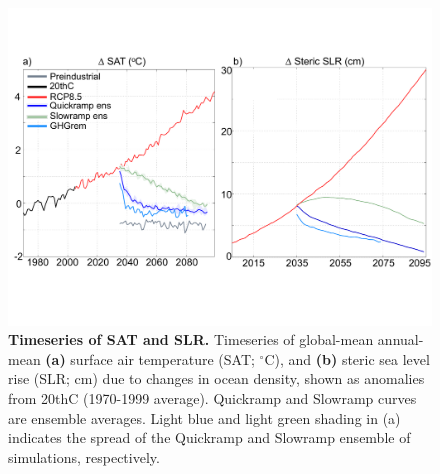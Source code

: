\documentclass[grl]{AGUTeX}  %
\begin{document}
\begin{article}
\begin{figure}[htbp] %
\centering
 \noindent\includegraphics[width=39pc]{figures/SATSLRtimeseries2.pdf}
\caption{\textbf{Timeseries of SAT and SLR.} Timeseries of global-mean annual-mean \textbf{(a)} surface air temperature (SAT; $^\circ$C), and \textbf{(b)} steric sea level rise (SLR; cm) due to changes in ocean density, shown as anomalies from 20thC (1970-1999 average). Quickramp and Slowramp curves are ensemble averages. Light blue and light green shading in (a) indicates the spread of the Quickramp and Slowramp ensemble of simulations, respectively.}
\label{fig:gmts} %
\end{figure}


\end{article}
\end{document}
